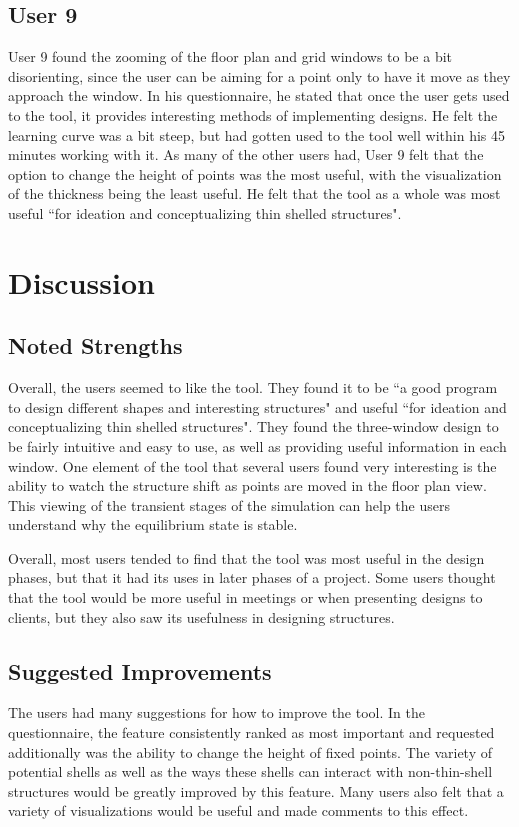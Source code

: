 \documentclass{thesis}
\begin{document}
\subsection{User 9}
User 9 found the zooming of the floor plan and grid windows to be a bit disorienting, since the user can be aiming for a point
only to have it move as they approach the window.  In his questionnaire, he stated that once the user gets used to the tool,
it provides interesting methods of implementing designs.  He felt the learning curve was a bit steep, but had gotten used to
the tool well within his 45 minutes working with it.  As many of the other users had, User 9 felt that the option to change
the height of points was the most useful, with the visualization of the thickness being the least useful.  He felt that the
tool as a whole was most useful ``for ideation and conceptualizing thin shelled structures".


\section{Discussion}
\subsection{Noted Strengths}
Overall, the users seemed to like the tool.  They found it to be ``a good program to design different shapes and interesting
structures" and useful ``for ideation and conceptualizing thin shelled structures".  They found the three-window design to be
fairly intuitive and easy to use, as well as providing useful information in each window.  One element of the tool that
several users found very interesting is the ability to watch the structure shift as points are moved in the floor plan view.
This viewing of the transient stages of the simulation can help the users understand why the equilibrium state is stable.

Overall, most users tended to find that the tool was most useful in the design phases, but that it had its uses in later
phases of a project.  Some users thought that the tool would be more useful in meetings or when presenting designs to clients,
but they also saw its usefulness in designing structures.

\subsection{Suggested Improvements}
The users had many suggestions for how to improve the tool.  In the questionnaire, the feature consistently ranked as most
important and requested additionally was the ability to change the height of fixed points.  The variety of potential shells
as well as the ways these shells can interact with non-thin-shell structures would be greatly improved by this feature.
Many users also felt that a variety of visualizations would be useful and made comments to this effect.
\end{document}

